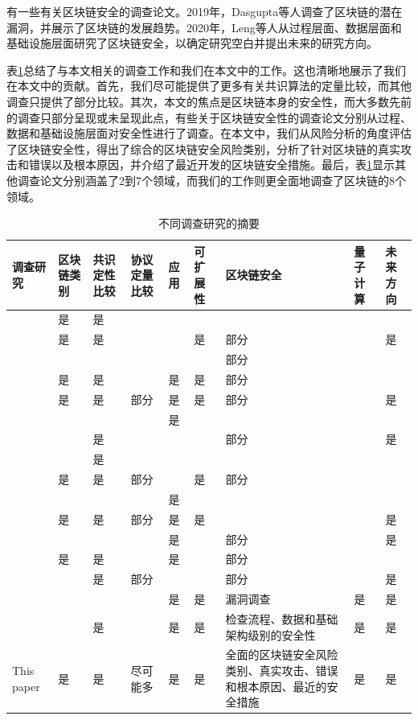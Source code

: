 \begin{translation}
有一些有关区块链安全的调查论文。2019年，Dasgupta等人调查了区块链的潜在漏洞，并展示了区块链的发展趋势\cite{art148}。2020年，Leng等人从过程层面、数据层面和基础设施层面研究了区块链安全，以确定研究空白并提出未来的研究方向\cite{art149}。

表\ref{tab:不同调查研究的摘要}总结了与本文相关的调查工作和我们在本文中的工作。这也清晰地展示了我们在本文中的贡献。首先，我们尽可能提供了更多有关共识算法的定量比较，而其他调查只提供了部分比较。其次，本文的焦点是区块链本身的安全性，而大多数先前的调查只部分呈现或未呈现此点，有些关于区块链安全性的调查论文分别从过程、数据和基础设施层面对安全性进行了调查。在本文中，我们从风险分析的角度评估了区块链安全性，得出了综合的区块链安全风险类别，分析了针对区块链的真实攻击和错误以及根本原因，并介绍了最近开发的区块链安全措施。最后，表\ref{tab:不同调查研究的摘要}显示其他调查论文分别涵盖了2到7个领域，而我们的工作则更全面地调查了区块链的8个领域。

\begin{table}[htbp] 
    \centering 
    \caption{不同调查研究的摘要} 
    \label{tab:不同调查研究的摘要} 
    \begin{tabular}{|p{1cm}|p{1cm}|p{1cm}|p{1cm}|p{1cm}|p{1cm}|p{3.5cm}|p{0.8cm}|p{0.8cm}|} 
    \hline 调查研究 & 区块链类别 & 共识定性比较 & 协议定量比较 & 应用 & 可扩展性 & 区块链安全 & 量子计算 & 未来方向 \\
    \hline \cite{art26} & 是 & 是 & & & & & & \\
    \hline \cite{art27} & 是 & 是 & & & 是 & 部分 & & 是 \\
    \hline \cite{art55} & & & & & & 部分 & & \\
    \hline \cite{art2,art28} & 是 & 是 & & 是 & 是 & 部分 & & \\
    \hline \cite{art3} & 是 & 是 & 部分 & 是 & 是 & 部分 & & 是 \\
    \hline \cite{art150} & & & & 是 & & & & \\
    \hline \cite{art29} & & 是 & & & & 部分 & & 是 \\
    \hline \cite{art30} & & 是 & & & & & & \\
    \hline \cite{art31} & 是 & 是 & 部分 & & 是 & 部分 & & \\
    \hline \cite{art32} & & & & 是 & & & & \\
    \hline \cite{art45} & 是 & 是 & 部分 & 是 & 是 & & & 是 \\
    \hline \cite{art44} & & & & 是 & & 部分 & & 是 \\
    \hline \cite{art146} & 是 & 是 & & 是 & & 部分 & & \\
    \hline \cite{art147} & & 是 & 部分 & & & 部分 & & 是 \\
    \hline \cite{art148} & & & & 是 & 是 & 漏洞调查 & 是 & 是 \\
    \hline \cite{art149} & & 是 & & 是 & 是 & 检查流程、数据和基础架构级别的安全性 & 是 & 是 \\
    \hline This paper & 是 & 是 & 尽可能多 & 是 & 是 & 全面的区块链安全风险类别、真实攻击、错误和根本原因、最近的安全措施 & 是 & 是 \\
    \hline 
    \end{tabular} 
\end{table}


\end{translation}
